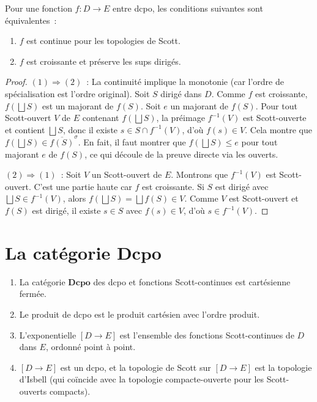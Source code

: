 \begin{theoreme}
Pour une fonction $f\colon D \to E$ entre dcpo, les conditions suivantes sont
\'equivalentes~:
\begin{enumerate}
  \item $f$ est continue pour les topologies de Scott.
  \item $f$ est croissante et pr\'eserve les sups dirig\'es.
\end{enumerate}
\end{theoreme}

\begin{proof}
$(1) \Rightarrow (2)$~: La continuit\'e implique la monotonie (car l'ordre de
sp\'ecialisation est l'ordre original). Soit $S$ dirig\'e dans $D$. Comme $f$ est
croissante, $f(\bigsqcup S)$ est un majorant de $f(S)$. Soit $e$ un majorant de $f(S)$.
Pour tout Scott-ouvert $V$ de $E$ contenant $f(\bigsqcup S)$, la pr\'eimage $f^{-1}(V)$ est
Scott-ouverte et contient $\bigsqcup S$, donc il existe $s \in S \cap f^{-1}(V)$, d'o\`u
$f(s) \in V$. Cela montre que $f(\bigsqcup S) \in \overline{f(S)}^{\sigma}$. En fait, il
faut montrer que $f(\bigsqcup S) \leq e$ pour tout majorant $e$ de $f(S)$, ce qui d\'ecoule
de la preuve directe via les ouverts.

$(2) \Rightarrow (1)$~: Soit $V$ un Scott-ouvert de $E$. Montrons que $f^{-1}(V)$ est
Scott-ouvert. C'est une partie haute car $f$ est croissante. Si $S$ est dirig\'e avec
$\bigsqcup S \in f^{-1}(V)$, alors $f(\bigsqcup S) = \bigsqcup f(S) \in V$. Comme $V$
est Scott-ouvert et $f(S)$ est dirig\'e, il existe $s \in S$ avec $f(s) \in V$, d'o\`u
$s \in f^{-1}(V)$.
\end{proof}

\section{La cat\'egorie $\mathbf{Dcpo}$}

\begin{theoreme}
\begin{enumerate}
  \item La cat\'egorie $\mathbf{Dcpo}$ des dcpo et fonctions Scott-continues est
    cart\'esienne ferm\'ee.
  \item Le produit de dcpo est le produit cart\'esien avec l'ordre produit.
  \item L'exponentielle $[D \to E]$ est l'ensemble des fonctions Scott-continues de $D$
    dans $E$, ordonn\'e point \`a point.
  \item $[D \to E]$ est un dcpo, et la topologie de Scott sur $[D \to E]$ est la topologie
    d'Isbell (qui co\"incide avec la topologie compacte-ouverte pour les Scott-ouverts
    compacts).
\end{enumerate}
\end{theoreme}

